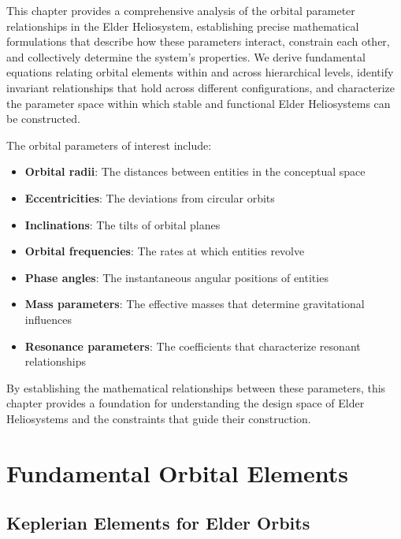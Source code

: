 This chapter provides a comprehensive analysis of the orbital parameter relationships in the Elder Heliosystem, establishing precise mathematical formulations that describe how these parameters interact, constrain each other, and collectively determine the system's properties. We derive fundamental equations relating orbital elements within and across hierarchical levels, identify invariant relationships that hold across different configurations, and characterize the parameter space within which stable and functional Elder Heliosystems can be constructed.

The orbital parameters of interest include:

\begin{itemize}
    \item \textbf{Orbital radii}: The distances between entities in the conceptual space
    \item \textbf{Eccentricities}: The deviations from circular orbits
    \item \textbf{Inclinations}: The tilts of orbital planes
    \item \textbf{Orbital frequencies}: The rates at which entities revolve
    \item \textbf{Phase angles}: The instantaneous angular positions of entities
    \item \textbf{Mass parameters}: The effective masses that determine gravitational influences
    \item \textbf{Resonance parameters}: The coefficients that characterize resonant relationships
\end{itemize}

By establishing the mathematical relationships between these parameters, this chapter provides a foundation for understanding the design space of Elder Heliosystems and the constraints that guide their construction.

\section{Fundamental Orbital Elements}

\subsection{Keplerian Elements for Elder Orbits}

